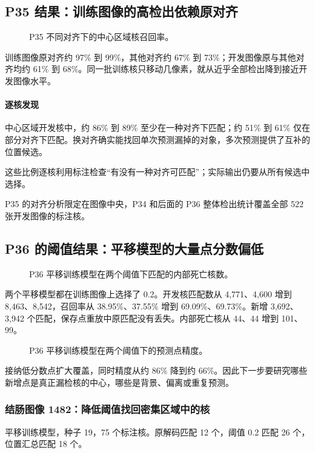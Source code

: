 \documentclass[
  12pt,
  fontset=fandol]{ctexart}
\begin{document}
\subsection{P35 结果：训练图像的高检出依赖原对齐}\label{chapter3}
\begin{figure}[H]\centering\caption{P35 不同对齐下的中心区域核召回率。}\end{figure}
训练图像原对齐约 97\% 到 99\%，其他对齐约 67\% 到 73\%；开发图像原与其他对齐均约 61\% 到 68\%。同一批训练核只移动几像素，就从近乎全部检出降到接近开发图像水平。

\paragraph{逐核发现}
中心区域开发核中，约 86\% 到 89\% 至少在一种对齐下匹配；约 51\% 到 61\% 仅在部分对齐下匹配。换对齐确实能找回单次预测漏掉的对象，多次预测提供了互补的位置候选。

这些比例逐核利用标注检查“有没有一种对齐可匹配”；实际输出仍要从所有候选中选择。

P35 的对齐分析限定在图像中央，P34 和后面的 P36 整体检出统计覆盖全部 522 张开发图像的标注核。

\subsection{P36 的阈值结果：平移模型的大量点分数偏低}\label{chapter4}
\begin{figure}[H]\centering\caption{P36 平移训练模型在两个阈值下匹配的内部死亡核数。}\end{figure}
两个平移模型都在训练图像上选择了 0.2。开发核匹配数从 4,771、4,600 增到 8,463、8,542，召回率从 38.95\%、37.55\% 增到 69.09\%、69.73\%。新增 3,692、3,942 个匹配，保存点重放中原匹配没有丢失。内部死亡核从 44、44 增到 101、99。

\begin{figure}[H]\centering\caption{P36 平移训练模型在两个阈值下的预测点精度。}\end{figure}
接纳低分数点扩大覆盖，同时精度从约 86\% 降到约 66\%。因此下一步要研究哪些新增点是真正漏检核的中心，哪些是背景、偏离或重复预测。

\subsubsection{结肠图像 1482：降低阈值找回密集区域中的核}\label{chapter5}
平移训练模型，种子 19，75 个标注核。原解码匹配 12 个，阈值 0.2 匹配 26 个，位置汇总匹配 18 个。
\end{document}
